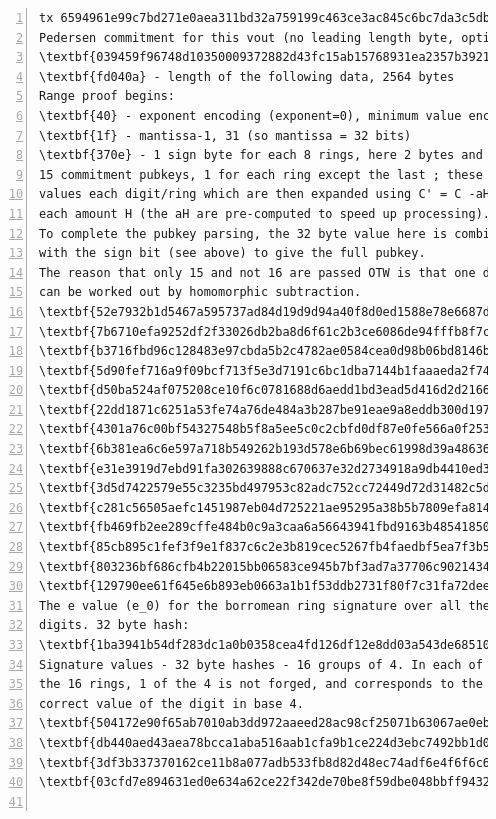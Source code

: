 \documentclass[10pt,a4paper]{article}
\begin{document}
\begin{Verbatim}[commandchars=\\\{\},numbers=left]
tx 6594961e99c7bd271e0aea311bd32a759199c463ce3ac845c6bc7da3c5db2a1d, vout index 0.
Pedersen commitment for this vout (no leading length byte, optimisation):
\textbf{039459f96748d10350009372882d43fc15ab15768931ea2357b3921814f8ec4f18}
\textbf{fd040a} - length of the following data, 2564 bytes
Range proof begins:
\textbf{40} - exponent encoding (exponent=0), minimum value encoding (minimum value = 0)
\textbf{1f} - mantissa-1, 31 (so mantissa = 32 bits)
\textbf{370e} - 1 sign byte for each 8 rings, here 2 bytes and 16 individual sign bits: 0011011100001110
15 commitment pubkeys, 1 for each ring except the last ; these are the `base'
values each digit/ring which are then expanded using C' = C -aH for
each amount H (the aH are pre-computed to speed up processing).
To complete the pubkey parsing, the 32 byte value here is combined
with the sign bit (see above) to give the full pubkey.
The reason that only 15 and not 16 are passed OTW is that one digit
can be worked out by homomorphic subtraction.
\textbf{52e7932b1d5467a595737ad84d19d9d94a40f8d0ed1588e78e6687d5ee2bb05e}
\textbf{7b6710efa9252df2f33026db2ba8d6f61c2b3ce6086de94fffb8f7ca7e9859c4}
\textbf{b3716fbd96c128483e97cbda5b2c4782ae0584cea0d98b06bd8146b510493603}
\textbf{5d90fef716a9f09bcf713f5e3d7191c6bc1dba7144b1faaaeda2f747e62e690c}
\textbf{d50ba524af075208ce10f6c0781688d6aedd1bd3ead5d416d2d21669dd0340b2}
\textbf{22dd1871c6251a53fe74a76de484a3b287be91eae9a8eddb300d1971ea1b4a57}
\textbf{4301a76c00bf54327548b5f8a5ee5c0c2cbfd0df87e0fe566a0f2536daee9cfb}
\textbf{6b381ea6c6e597a718b549262b193d578e6b69bec61998d39a48636e0a2258d4}
\textbf{e31e3919d7ebd91fa302639888c670637e32d2734918a9db4410ed3cd7fc028a}
\textbf{3d5d7422579e55c3235bd497953c82adc752cc72449d72d31482c5d8eab7feb0}
\textbf{c281c56505aefc1451987eb04d725221ae95295a38b5b7809efa814be77f65b7}
\textbf{fb469fb2ee289cffe484b0c9a3caa6a56643941fbd9163b48541850039973704}
\textbf{85cb895c1fef3f9e1f837c6c2e3b819cec5267fb4faedbf5ea7f3b50092a39e6}
\textbf{803236bf686cfb4b22015bb06583ce945b7bf3ad7a37706c90214349ac73a640}
\textbf{129790ee61f645e6b893eb0663a1b1f53ddb2731f80f7c31fa72deeb872d2877}
The e value (e_0) for the borromean ring signature over all the
digits. 32 byte hash:
\textbf{1ba3941b54df283dc1a0b0358cea4fd126df12e8dd03a543de685102329581da}
Signature values - 32 byte hashes - 16 groups of 4. In each of
the 16 rings, 1 of the 4 is not forged, and corresponds to the
correct value of the digit in base 4.
\textbf{504172e90f65ab7010ab3dd972aaeed28ac98cf25071b63067ae0eb89b337390}
\textbf{db440aed43aea78bcca1aba516aab1cfa9b1ce224d3ebc7492bb1d02596034d8}
\textbf{3df3b337370162ce11b8a077adb533fb8d82d48ec74adf6e4f6f6c6c2af65e49}
\textbf{03cfd7e894631ed0e634a62ce22f342de70be8f59dbe048bbff94329763ad24e}


\end{Verbatim}
\end{document}

